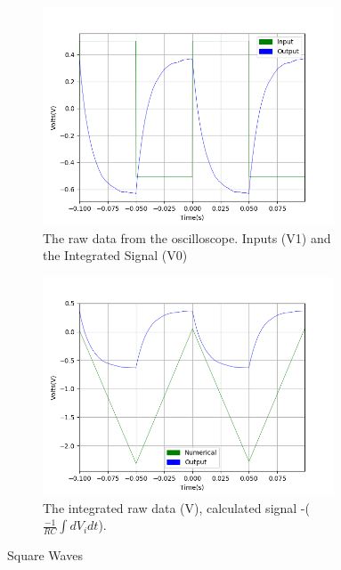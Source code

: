 \begin{figure}[h!]
\centering
\begin{subfigure}[t]{.475\textwidth}
  \centering
  \includegraphics[width=0.95\textwidth, height=0.20\textheight]{figures/Intergration/scope_23raw.png}
  \caption{The raw data from the oscilloscope. Inputs (V1) and the Integrated Signal (V0)}
 \label{fig:int_2_og_data}
\end{subfigure}\hfill
\begin{subfigure}[t]{.475\textwidth}
  \centering
  \includegraphics[width=0.95\textwidth, height=0.20\textheight]{figures/Intergration/scope_23.png}
  \caption{The integrated raw data (V), calculated signal -($\frac{-1}{RC}\int dV_i dt$).}
\label{fig:int_2_calc_data}
\end{subfigure}
\caption{Square Waves}
\label{fig:sum_2}
\end{figure}


